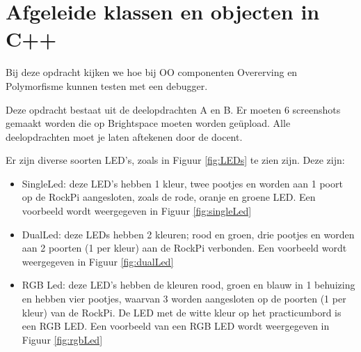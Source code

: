 \chapter{Afgeleide klassen en objecten in C++} \label{chap:inh}

Bij deze opdracht kijken we hoe bij OO componenten Overerving en Polymorfisme kunnen testen met een debugger.

Deze opdracht bestaat uit de deelopdrachten A en B. Er moeten 6 screenshots gemaakt worden die op Brightspace moeten worden geüpload. Alle deelopdrachten moet je laten aftekenen door de docent.

Er zijn diverse soorten LED's, zoals in Figuur \ref{fig:LEDs} te zien zijn. Deze zijn:
\begin{itemize}
	\item SingleLed: deze LED's hebben 1 kleur, twee pootjes en worden aan 1 poort op de RockPi aangesloten, zoals de rode, oranje en groene LED. Een voorbeeld wordt weergegeven in Figuur \ref{fig:singleLed}
	\item DualLed: deze LEDs hebben 2 kleuren; rood en groen, drie pootjes en worden aan 2 poorten (1 per kleur) aan de RockPi verbonden. Een voorbeeld wordt weergegeven in Figuur \ref{fig:dualLed}
	\item RGB Led: deze LED's hebben de kleuren rood, groen en blauw in 1 behuizing en hebben vier pootjes, waarvan 3 worden aangesloten op de poorten (1 per kleur) van de RockPi. De LED met de witte kleur op het practicumbord is een RGB LED. Een voorbeeld van een RGB LED wordt weergegeven in Figuur \ref{fig:rgbLed}
\end{itemize}

